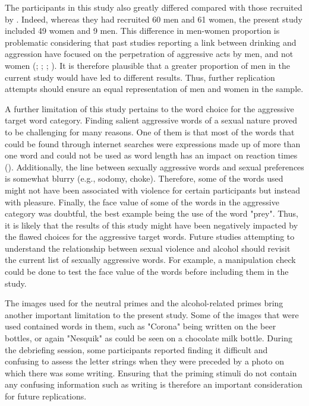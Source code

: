 \documentclass[serif, authordate, twocolumn, empirical]{jote-article}
\begin{document}
The participants in this study also greatly differed compared with those recruited by \textcite{BartholowHeinz2006}. Indeed, whereas they had recruited 60 men and 61 women, the present study included 49 women and 9 men. This difference in men-women proportion is problematic considering that past studies reporting a link between drinking and aggression have focused on the perpetration of aggressive acts by men, and not women (\cite{AbbeyClintonSherrodMcAuslanZawackiBuck2003}; 
\cite{GidyczWarkentinOrchowski2007};
\cite{JakupcakLisakRoemer2002};   
 ). It is therefore plausible that a greater proportion of men in the current study would have led to different results. Thus, further replication attempts should ensure an equal representation of men and women in the sample.

A further limitation of this study pertains to the word choice for the aggressive target word category. Finding salient aggressive words of a sexual nature proved to be challenging for many reasons. One of them is that most of the words that could be found through internet searches were expressions made up of more than one word and could not be used as word length has an impact on reaction times (). Additionally, the line between sexually aggressive words and sexual preferences is somewhat blurry (e.g., sodomy, choke). Therefore, some of the words used might not have been associated with violence for certain participants but instead with pleasure. Finally, the face value of some of the words in the aggressive category was doubtful, the best example being the use of the word "prey". Thus, it is likely that the results of this study might have been negatively impacted by the flawed choices for the aggressive target words. Future studies attempting to understand the relationship between sexual violence and alcohol should revisit the current list of sexually aggressive words. For example, a manipulation check could be done to test the face value of the words before including them in the study.

The images used for the neutral primes and the alcohol-related primes bring another important limitation to the present study. Some of the images that were used contained words in them, such as "Corona" being written on the beer bottles, or again "Nesquik" as could be seen on a chocolate milk bottle. During the debriefing session, some participants reported finding it difficult and confusing to assess the letter strings when they were preceded by a photo on which there was some writing. Ensuring that the priming stimuli do not contain any confusing information such as writing is therefore an important consideration for future replications.
\end{document}
